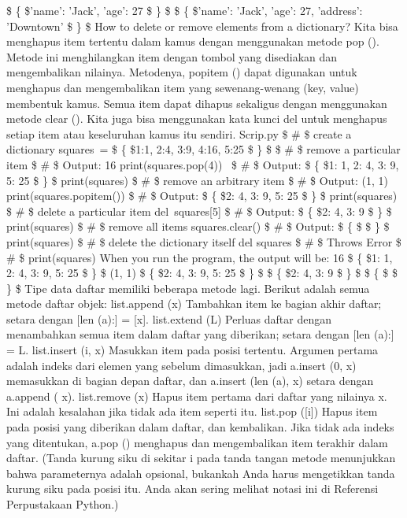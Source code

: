  \$  \{  \$'name': 'Jack', 'age': 27 \$  \}  \$ 
 \$  \{  \$'name': 'Jack', 'age': 27, 'address': 'Downtown' \$  \}  \$ 
How to delete or remove elements from a dictionary?
Kita bisa menghapus item tertentu dalam kamus dengan menggunakan metode pop (). Metode ini menghilangkan item dengan tombol yang disediakan dan mengembalikan nilainya. 
Metodenya, popitem () dapat digunakan untuk menghapus dan mengembalikan item yang sewenang-wenang (key, value) membentuk kamus. Semua item dapat dihapus sekaligus dengan menggunakan metode clear (). 
Kita juga bisa menggunakan kata kunci del untuk menghapus setiap item atau keseluruhan kamus itu sendiri. 
Scrip.py 
   \$  \#  \$ create a dictionary 
  squares~=  \$  \{  \$1:1, 2:4, 3:9, 4:16, 5:25 \$  \}  \$   
   \$  \#  \$ remove a particular item 
   \$  \#  \$ Output: 16 
  print(squares.pop(4))~  
   \$  \#  \$ Output:  \$  \{  \$1: 1, 2: 4, 3: 9, 5: 25 \$  \}  \$ 
  print(squares) 
   \$  \#  \$ remove an arbitrary item 
   \$  \#  \$ Output: (1, 1) 
  print(squares.popitem()) 
   \$  \#  \$ Output:  \$  \{  \$2: 4, 3: 9, 5: 25 \$  \}  \$ 
  print(squares) 
   \$  \#  \$ delete a particular item 
  del~squares[5]   
   \$  \#  \$ Output:  \$  \{  \$2: 4, 3: 9 \$  \}  \$ 
  print(squares) 
   \$  \#  \$ remove all items 
  squares.clear() 
   \$  \#  \$ Output:  \$  \{  \$ \$  \}  \$ 
  print(squares) 
   \$  \#  \$ delete the dictionary itself 
  del squares 
  \$  \#  \$ Throws Error 
  \$  \#  \$ print(squares) 
When you run the program, the output will be: 
16 
 \$  \{  \$1: 1, 2: 4, 3: 9, 5: 25 \$  \}  \$ 
(1, 1) 
 \$  \{  \$2: 4, 3: 9, 5: 25 \$  \}  \$ 
 \$  \{  \$2: 4, 3: 9 \$  \}  \$ 
 \$  \{  \$ \$  \}  \$ 
Tipe data daftar memiliki beberapa metode lagi. Berikut adalah semua metode daftar objek: 
list.append (x) 
Tambahkan item ke bagian akhir daftar; setara dengan [len (a):] = [x]. 
list.extend (L) 
Perluas daftar dengan menambahkan semua item dalam daftar yang diberikan; setara dengan [len (a):] = L. 
list.insert (i, x) 
Masukkan item pada posisi tertentu. Argumen pertama adalah indeks dari elemen yang sebelum dimasukkan, jadi a.insert (0, x) memasukkan di bagian depan daftar, dan a.insert (len (a), x) setara dengan a.append ( x). 
list.remove (x) 
Hapus item pertama dari daftar yang nilainya x. Ini adalah kesalahan jika tidak ada item seperti itu. 
list.pop ([i]) 
Hapus item pada posisi yang diberikan dalam daftar, dan kembalikan. Jika tidak ada indeks yang ditentukan, a.pop () menghapus dan mengembalikan item terakhir dalam daftar. (Tanda kurung siku di sekitar i pada tanda tangan metode menunjukkan bahwa parameternya adalah opsional, bukankah Anda harus mengetikkan tanda kurung siku pada posisi itu. Anda akan sering melihat notasi ini di Referensi Perpustakaan Python.) 
